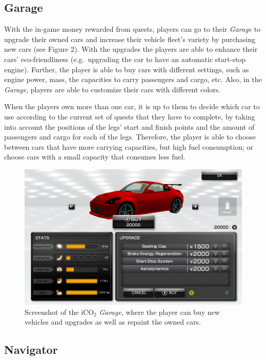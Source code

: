 \documentclass[preprint,authoryear,12pt]{elsarticle}
\begin{document}
\subsection{Garage}

With the in-game money rewarded from quests, players can go to their \textit{Garage} to upgrade their owned cars and increase their vehicle fleet's variety by purchasing new cars (see Figure 2). With the upgrades the players are able to enhance their cars' eco-friendliness (e.g.~upgrading the car to have an automatic start-stop engine). Further, the player is able to buy cars with different settings, such as engine power, mass, the capacities to carry passengers and cargo, etc. Also, in the \textit{Garage}, players are able to customize their cars with different colors.

When the players own more than one car, it is up to them to decide which car to use according to the current set of quests that they have to complete, by taking into account the positions of the legs' start and finish points and the amount of passengers and cargo for each of the legs. Therefore, the player is able to choose between cars that have more carrying capacities, but high fuel consumption; or choose cars with a small capacity that consumes less fuel.


\begin{figure}[htb]
\begin{center}
\includegraphics[width=.80\linewidth]{ijhcs14-img/iCO2_garage}
\caption{Screenshot of the iCO$_2$ \textit{Garage}, where the player can buy new vehicles and upgrades as well as repaint the owned cars.\label{fig:iCO2_garage}}
\end{center}
\end{figure}

\subsection{Navigator}
\end{document}
